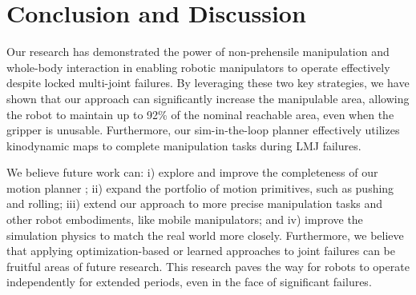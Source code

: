 \section{Conclusion and Discussion}\label{sec:conclusion}
Our research has demonstrated the power of non-prehensile manipulation and whole-body interaction in enabling robotic manipulators to operate effectively despite locked multi-joint failures. By leveraging these two key strategies, we have shown that our approach can significantly increase the manipulable area, allowing the robot to maintain up to 92\% of the nominal reachable area, even when the gripper is unusable. Furthermore, our sim-in-the-loop planner effectively utilizes kinodynamic maps to complete manipulation tasks during LMJ failures. 

We believe future work can: i) explore and improve the completeness of our motion planner \cite{kleinbort2018probabilistic}; ii) expand the portfolio of motion primitives, such as pushing and rolling; iii) extend our approach to more precise manipulation tasks and other robot embodiments, like mobile manipulators; and iv) improve the simulation physics to match the real world more closely. Furthermore, we believe that applying optimization-based or learned approaches to joint failures can be fruitful areas of future research. This research paves the way for robots to operate independently for extended periods, even in the face of significant failures.
 